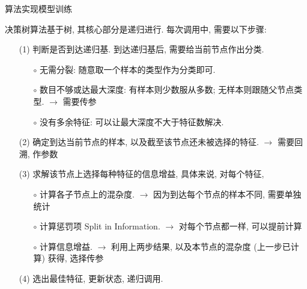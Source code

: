 




\begin{frame}{算法实现}{模型训练}

\vspace{-0.2cm}

决策树算法基于树, 其核心部分是递归进行. 每次调用中, 需要以下步骤:

\begin{itemize}
\item[(1)] 判断是否到达递归基. 到达递归基后, 需要给当前节点作出分类.
\begin{itemize}\setlength{\itemindent}{-1em}
\item[$\circ$] 无需分裂: 随意取一个样本的类型作为分类即可.
\item[$\circ$] 数目不够或达最大深度: 有样本则少数服从多数; 无样本则跟随父节点类型.  $\longrightarrow$ 需要传参
\item[$\circ$] 没有多余特征: 可以让最大深度不大于特征数解决.
\end{itemize}
\item[(2)] 确定到达当前节点的样本, 以及截至该节点还未被选择的特征. $\longrightarrow$ 需要回溯, 作参数
\item[(3)] 求解该节点上选择每种特征的信息增益, 具体来说, 对每个特征,
\begin{itemize}\setlength{\itemindent}{-1em}
\item[$\circ$] 计算各子节点上的混杂度. $\longrightarrow$ 因为到达每个节点的样本不同, 需要单独统计
\item[$\circ$] 计算惩罚项 Split in Information. $\longrightarrow$ 对每个节点都一样, 可以提前计算
\item[$\circ$] 计算信息增益. $\longrightarrow$ 利用上两步结果, 以及本节点的混杂度 (上一步已计算) 获得, 选择传参
\end{itemize}
\item[(4)] 选出最佳特征, 更新状态, 递归调用.
\end{itemize}

\end{frame}

